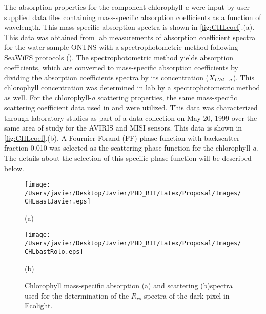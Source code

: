 \documentclass[onecolumn,3p]{elsarticle}
\begin{document}
The absorption properties for the component chlorophyll-{\it a} were input by user-supplied data files containing mass-specific absorption coefficients as a function of wavelength. This mass-specific absorption spectra is shown in \autoref{fig:CHLcoef}.(a). This data was obtained from lab measurements of absorption coefficient spectra for the water sample ONTNS with a spectrophotometric method following SeaWiFS protocols (\cite{Mueller1995}). The spectrophotometric method yields absorption coefficients, which are converted to mass-specific absorption coefficients by dividing the absorption coefficients spectra by its concentration ($X_{Chl-{\it a}}$). This chlorophyll concentration was determined in lab by a { spectrophotometric method} as well. For the chlorophyll-{\it a} scattering properties, the same mass-specific scattering coefficient data used in \cite{Raqueno:2000} and \cite{Raqueno:2003} were utilized. This data was characterized through laboratory studies as part of a data collection on May 20, 1999 over the same area of study for the AVIRIS and MISI sensors. This data is shown in \autoref{fig:CHLcoef}.(b). A Fournier-Forand (FF) phase function with backscatter fraction 0.010 was selected as the scattering phase function for the chlorophyll-{\it a}. The details about the selection of this specific phase function will be described below.

\begin{figure}[htb]
  	\begin{minipage}[c]{0.48\linewidth}
    	\centering
  		\texttt{[image: /Users/javier/Desktop/Javier/PHD\_RIT/Latex/Proposal/Images/CHLaastJavier.eps]}
		\centerline{(a)}\medskip
  	\end{minipage}  
  	\hfill
  	\begin{minipage}[c]{0.48\linewidth}
    	\centering
  		\texttt{[image: /Users/javier/Desktop/Javier/PHD\_RIT/Latex/Proposal/Images/CHLbastRolo.eps]}
  		\centerline{(b)}\medskip
  	\end{minipage}	
  	\caption{Chlorophyll mass-specific absorption (a) and scattering (b)spectra used for the determination of the $R_{rs}$ spectra of the dark pixel in Ecolight. \label{fig:CHLcoef} } 
\end{figure}
\end{document}

